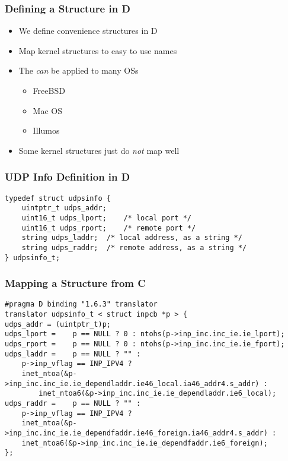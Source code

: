\documentclass[pdftex]{beamer}
\begin{document}
\begin{frame}
  \frametitle{Defining a Structure in D}
  \begin{itemize}
  \item We define convenience structures in D
  \item Map kernel structures to easy to use names
  \item The \emph{can} be applied to many OSs
    \begin{itemize}
    \item FreeBSD
    \item Mac OS
    \item Illumos
    \end{itemize}
  \item Some kernel structures just do \emph{not} map well
  \end{itemize}
\end{frame}

\begin{frame}[fragile]
  \frametitle{UDP Info Definition in D}
\begin{lstlisting}
typedef struct udpsinfo {
	uintptr_t udps_addr;
	uint16_t udps_lport;	/* local port */
	uint16_t udps_rport;	/* remote port */
	string udps_laddr;	/* local address, as a string */
	string udps_raddr;	/* remote address, as a string */
} udpsinfo_t;
\end{lstlisting}
\end{frame}

\begin{frame}[fragile]
  \frametitle{Mapping a Structure from C}
\begin{lstlisting}
#pragma D binding "1.6.3" translator
translator udpsinfo_t < struct inpcb *p > {
udps_addr =	(uintptr_t)p;
udps_lport =	p == NULL ? 0 : ntohs(p->inp_inc.inc_ie.ie_lport);
udps_rport =	p == NULL ? 0 : ntohs(p->inp_inc.inc_ie.ie_fport);
udps_laddr =	p == NULL ? "" :
    p->inp_vflag == INP_IPV4 ?
    inet_ntoa(&p->inp_inc.inc_ie.ie_dependladdr.ie46_local.ia46_addr4.s_addr) :
	    inet_ntoa6(&p->inp_inc.inc_ie.ie_dependladdr.ie6_local);
udps_raddr =	p == NULL ? "" :
    p->inp_vflag == INP_IPV4 ?
    inet_ntoa(&p->inp_inc.inc_ie.ie_dependfaddr.ie46_foreign.ia46_addr4.s_addr) :
    inet_ntoa6(&p->inp_inc.inc_ie.ie_dependfaddr.ie6_foreign);
};
\end{lstlisting}
\end{frame}
\end{document}
